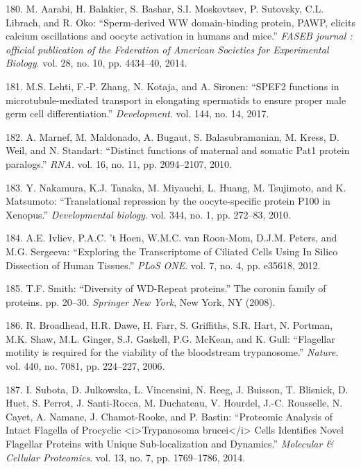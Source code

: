 \documentclass[12pt,a4paper,twoside]{ugathesis}
\theoremstyle{definition}
\theoremstyle{definition}
\theoremstyle{definition}
\theoremstyle{remark}
\begin{document}
\hypertarget{ref-Aarabi2014a}{}
180. M. Aarabi, H. Balakier, S. Bashar, S.I. Moskovtsev, P. Sutovsky,
C.L. Librach, and R. Oko: ``Sperm-derived WW domain-binding protein,
PAWP, elicits calcium oscillations and oocyte activation in humans and
mice.'' \emph{FASEB journal : official publication of the Federation of
American Societies for Experimental Biology}. vol. 28, no. 10, pp.
4434--40, 2014.

\hypertarget{ref-Lehti2017}{}
181. M.S. Lehti, F.-P. Zhang, N. Kotaja, and A. Sironen: ``SPEF2
functions in microtubule-mediated transport in elongating spermatids to
ensure proper male germ cell differentiation.'' \emph{Development}. vol.
144, no. 14, 2017.

\hypertarget{ref-Marnef2010}{}
182. A. Marnef, M. Maldonado, A. Bugaut, S. Balasubramanian, M. Kress,
D. Weil, and N. Standart: ``Distinct functions of maternal and somatic
Pat1 protein paralogs.'' \emph{RNA}. vol. 16, no. 11, pp. 2094--2107,
2010.

\hypertarget{ref-Nakamura2010}{}
183. Y. Nakamura, K.J. Tanaka, M. Miyauchi, L. Huang, M. Tsujimoto, and
K. Matsumoto: ``Translational repression by the oocyte-specific protein
P100 in Xenopus.'' \emph{Developmental biology}. vol. 344, no. 1, pp.
272--83, 2010.

\hypertarget{ref-Ivliev2012}{}
184. A.E. Ivliev, P.A.C. 't Hoen, W.M.C. van Roon-Mom, D.J.M. Peters,
and M.G. Sergeeva: ``Exploring the Transcriptome of Ciliated Cells Using
In Silico Dissection of Human Tissues.'' \emph{PLoS ONE}. vol. 7, no. 4,
pp. e35618, 2012.

\hypertarget{ref-Smith2008}{}
185. T.F. Smith: ``Diversity of WD-Repeat proteins.'' The coronin family
of proteins. pp. 20--30. \emph{Springer New York}, New York, NY (2008).

\hypertarget{ref-Broadhead2006}{}
186. R. Broadhead, H.R. Dawe, H. Farr, S. Griffiths, S.R. Hart, N.
Portman, M.K. Shaw, M.L. Ginger, S.J. Gaskell, P.G. McKean, and K. Gull:
``Flagellar motility is required for the viability of the bloodstream
trypanosome.'' \emph{Nature}. vol. 440, no. 7081, pp. 224--227, 2006.

\hypertarget{ref-Subota2014}{}
187. I. Subota, D. Julkowska, L. Vincensini, N. Reeg, J. Buisson, T.
Blisnick, D. Huet, S. Perrot, J. Santi-Rocca, M. Duchateau, V. Hourdel,
J.-C. Rousselle, N. Cayet, A. Namane, J. Chamot-Rooke, and P. Bastin:
``Proteomic Analysis of Intact Flagella of Procyclic
\textless{}i\textgreater{}Trypanosoma brucei\textless{}/i\textgreater{}
Cells Identifies Novel Flagellar Proteins with Unique Sub-localization
and Dynamics.'' \emph{Molecular \& Cellular Proteomics}. vol. 13, no. 7,
pp. 1769--1786, 2014.
\end{document}
